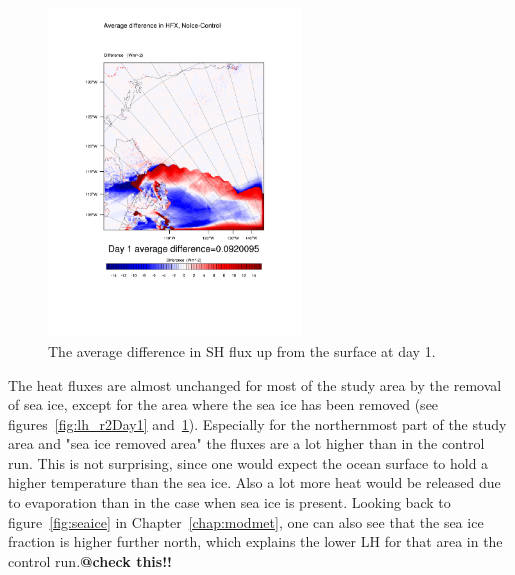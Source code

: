 \begin{figure}
\centering
\includegraphics[width=0.6\textwidth]{results/noice/diff_NoIce_HFX_Day1.pdf}
\caption{The average difference in SH flux up from the surface at day 1.}
\label{fig:sh_r2Day1}
\end{figure}

The heat fluxes are almost unchanged for most of the study area by the removal of sea ice, except for the area where the sea ice has been removed (see figures~\ref{fig:lh_r2Day1} and~\ref{fig:sh_r2Day1}). Especially for the northernmost part of the study area and "sea ice removed area" the fluxes are a lot higher than in the control run. This is not surprising, since one would expect the ocean surface to hold a higher temperature than the sea ice. Also a lot more heat would be released due to evaporation than in the case when sea ice is present. Looking back to figure~\ref{fig:seaice} in Chapter~\ref{chap:modmet}, one can also see that the sea ice fraction is higher further north, which explains the lower LH for that area in the control run.\textbf{@check this!!}

